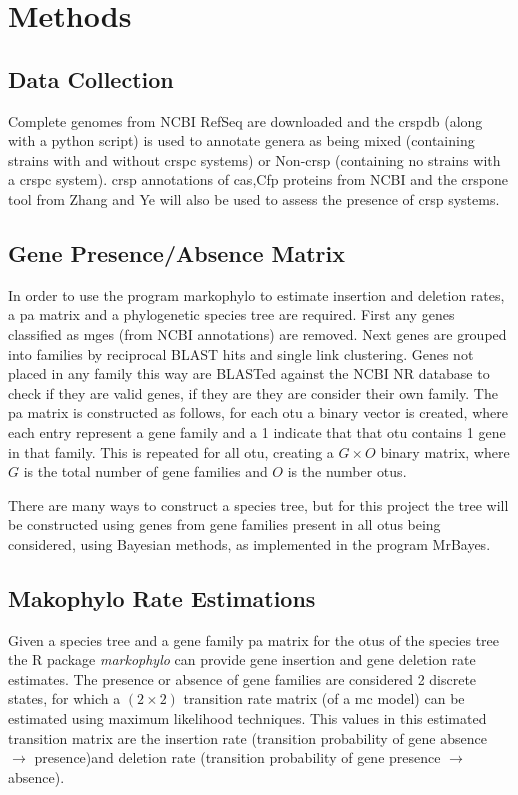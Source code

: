 \section{\huge Methods}
\subsection{Data Collection}
Complete genomes from NCBI RefSeq are downloaded and the \ac{crsp}db (along with a python script) is used to annotate genera as being mixed (containing strains with and without \ac{crspc} systems) or Non-\ac{crsp} (containing no strains with a \ac{crspc} system)\citep{crispdb}.
\ac{crsp} annotations of \ac{cas},Cfp proteins from NCBI and the \ac{crsp}one tool from Zhang and Ye will also be used to assess the presence of \ac{crsp} systems\citep{ineqcas}.
\subsection{Gene Presence/Absence Matrix}
In order to use the program markophylo to estimate insertion and deletion rates, a \ac{pa} matrix and a phylogenetic species tree are required.
First any genes classified as \ac{mge}s (from NCBI annotations) are removed.
Next genes are grouped into families by reciprocal BLAST hits and single link clustering.
Genes not placed in any family this way are BLASTed against the NCBI NR database to check if they are valid genes, if they are they are consider their own family.
The \ac{pa} matrix is constructed as follows, for each \ac{otu} a binary vector is created, where each entry represent a gene family and a 1 indicate that that \ac{otu} contains 1 gene in that family.
This is repeated for all \ac{otu}, creating a $G \times O$ binary matrix, where $G$ is the total number of gene families and $O$ is the number \ac{otu}s.\par
There are many ways to construct a species tree, but for this project the tree will be constructed using genes from gene families present in all \ac{otu}s being considered, using Bayesian methods, as implemented in the program MrBayes.
\subsection{Makophylo Rate Estimations}
Given a species tree and a gene family \ac{pa} matrix for the \ac{otu}s of the species tree the R package \textit{markophylo} can provide gene insertion and gene deletion rate estimates\citep{marko}.
The presence or absence of gene families are considered 2 discrete states, for which a $(2\times 2)$ transition rate matrix (of a \ac{mc} model) can be estimated using maximum likelihood techniques.
This values in this estimated transition matrix are the insertion rate (transition probability of gene absence $\to$ presence)and deletion rate (transition probability of gene presence $\to$ absence)\citep{marko}.
